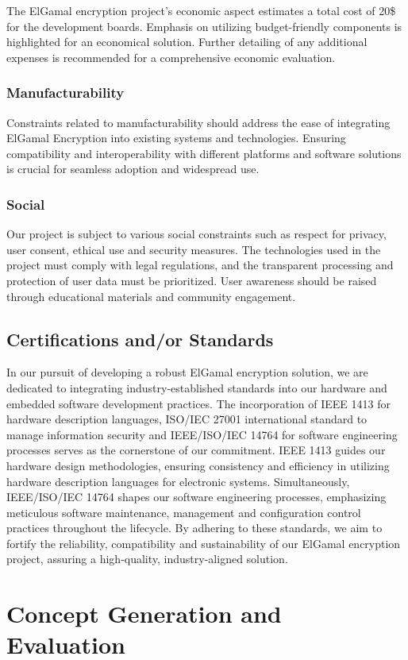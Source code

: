 \documentclass[12pt]{article}
\begin{document}
	The ElGamal encryption project's economic aspect estimates a total cost of 20\$ for the development boards. Emphasis on utilizing budget-friendly components is highlighted for an economical solution. Further detailing of any additional expenses is recommended for a comprehensive economic evaluation.
	\subsubsection{Manufacturability}
	Constraints related to manufacturability should address the ease of integrating ElGamal Encryption into existing systems and technologies. Ensuring compatibility and interoperability with different platforms and software solutions is crucial for seamless adoption and widespread use.
	\subsubsection{Social}
	Our project is subject to various social constraints such as respect for privacy, user consent, ethical use and security measures. The technologies used in the project must comply with legal regulations, and the transparent processing and protection of user data must be prioritized. User awareness should be raised through educational materials and community engagement.
	\subsection{Certifications and/or Standards}
	In our pursuit of developing a robust ElGamal encryption solution, we are dedicated to integrating industry-established standards into our hardware and embedded software development practices. The incorporation of IEEE 1413 for hardware description languages, ISO/IEC 27001 international standard to manage information security and IEEE/ISO/IEC 14764 for software engineering processes serves as the cornerstone of our commitment. IEEE 1413 guides our hardware design methodologies, ensuring consistency and efficiency in utilizing hardware description languages for electronic systems. Simultaneously, IEEE/ISO/IEC 14764 shapes our software engineering processes, emphasizing meticulous software maintenance, management and configuration control practices throughout the lifecycle. By adhering to these standards, we aim to fortify the reliability, compatibility and sustainability of our ElGamal encryption project, assuring a high-quality, industry-aligned solution.
	\section{Concept Generation and Evaluation}
	
\end{document}
